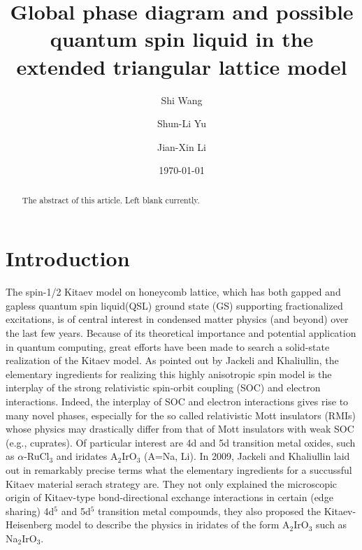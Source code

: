 \documentclass[aps,prb,reprint,groupedaddress,showpacs,amsfonts,amsmath,amssymb,superscriptaddress]{revtex4-1}
\begin{document}
\title{Global phase diagram and possible quantum spin liquid in the extended triangular lattice model}

\author{Shi Wang}
\author{Shun-Li Yu}
\author{Jian-Xin Li}

\date{\today}

\begin{abstract}
The abstract of this article. Left blank currently.
\end{abstract}

\maketitle

\section{Introduction}
The spin-1/2 Kitaev model on honeycomb lattice, which has both gapped and gapless quantum spin liquid(QSL) ground state (GS) supporting fractionalized excitations, is of central interest in condensed matter physics (and beyond) over the last few years. Because of its theoretical importance and potential application in quantum computing, great efforts have been made to search a solid-state realization of the Kitaev model. As pointed out by Jackeli and Khaliullin, the elementary ingredients for realizing this highly anisotropic spin model is the interplay of the strong relativistic spin-orbit coupling (SOC) and electron interactions. Indeed, the interplay of SOC and electron interactions gives rise to many novel phases, especially for the so called relativistic Mott insulators (RMIs) whose physics may drastically differ from that of Mott insulators with weak SOC (e.g., cuprates). Of particular interest are 4d and 5d transition metal oxides, such as $\alpha$-RuCl$_3$ and iridates A$_2$IrO$_3$ (A=Na, Li).
In 2009, Jackeli and Khaliullin laid out in remarkably precise terms what the elementary ingredients for a succussful Kitaev material serach strategy are. They not only explained the microscopic origin of Kitaev-type bond-directional exchange interactions in certain (edge sharing) 4d$^5$ and 5d$^5$ transition metal compounds, they also proposed the Kitaev-Heisenberg model to describe the physics in iridates of the form A$_2$IrO$_3$ such as Na$_2$IrO$_3$.
\end{document}
